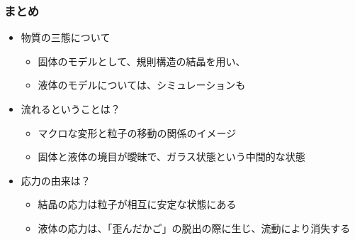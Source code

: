 \documentclass[12pt, dvipdfmx]{beamer}
\newcommand{\backupbegin}{
   \newcounter{framenumberappendix}
   \setcounter{framenumberappendix}{\value{framenumber}}
}
\newcommand{\backupend}{
   \addtocounter{framenumberappendix}{-\value{framenumber}}
   \addtocounter{framenumber}{\value{framenumberappendix}} 
}
\begin{document}
\begin{frame}
	\frametitle{まとめ}
	\begin{boxnote}
		\vspace{-3mm}
		\begin{itemize}
			\item 物質の三態について
			\begin{itemize}
				\item 固体のモデルとして、規則構造の結晶を用い、
				\item 液体のモデルについては、シミュレーションも
			\end{itemize} 
			\item 流れるということは？
			\begin{itemize}
				\item マクロな変形と粒子の移動の関係のイメージ
				\item 固体と液体の境目が曖昧で、ガラス状態という中間的な状態
			\end{itemize} 
			\item 応力の由来は？
			\begin{itemize}
				\item 結晶の応力は粒子が相互に安定な状態にある
				\item 液体の応力は、「歪んだかご」の脱出の際に生じ、流動により消失する
			\end{itemize}
		\end{itemize}
	\end{boxnote}
\end{frame}



\end{document}
